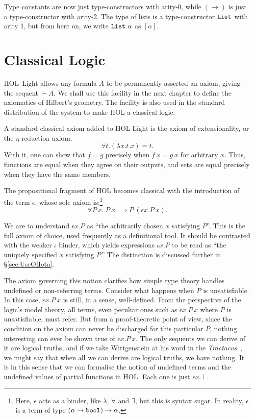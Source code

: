 Type constants are now just type-constructors with arity-0, while $(\rightarrow)$ is just a type-constructor with arity-2. The type of lists is a type-constructor $\texttt{List}$ with arity 1, but from here on, we write $\texttt{List}\ \alpha$ as $[\alpha]$.

\section{Classical Logic}\label{sec:ClassicalAxioms}
HOL~Light allows any formula $A$ to be permanently asserted an axiom, giving the sequent $\vdash A$. We shall use this facility in the next chapter to define the axiomatics of Hilbert's geometry. The facility is also used in the standard distribution of the system to make HOL a classical logic.

A standard classical axiom added to HOL Light is the axiom of extensionality, or the $\eta$-reduction axiom. 
\begin{displaymath}
\forall t. (\lambda x. t\ x) = t.
\end{displaymath}
With it, one can show that $f = g$ precisely when $f\ x = g\ x$ for arbitrary $x$. Thus, functions are equal when they agree on their outputs, and sets are equal precisely when they have the same members.

The propositional fragment of HOL becomes classical with the introduction of the term $\epsilon$, whose sole axiom is:\footnote{Here, $\epsilon$ acts as a binder, like $\lambda$, $\forall$ and $\exists$, but this is syntax sugar. In reality, $\epsilon$ is a term of type $(\alpha \rightarrow \texttt{bool}) \rightarrow \alpha$.}
\begin{displaymath}
\forall P\ x.\ P\ x \implies P\ (\epsilon x. P\ x).
\end{displaymath}

We are to understand $\epsilon x. P$ as ``the arbitrarily chosen $x$ satisfying $P$''. This is the full axiom of choice, used frequently as a definitional tool. It should be contrasted with the weaker $\iota$ binder, which yields expressions $\iota x. P$ to be read as ``the uniquely specified $x$ satisfying $P$.'' The distinction is discussed further in \S\ref{sec:UseOfIota}.

The axiom governing this notion clarifies how simple type theory handles undefined or non-referring terms. Consider what happens when $P$ is unsatisfiable. In this case, $\epsilon x. P\ x$ is still, in a sense, well-defined. From the perspective of the logic's model theory, all terms, even peculiar ones such as $\epsilon x. P\ x$ where $P$ is unsatisfiable, must refer. But from a proof-theoretic point of view, since the condition on the axiom can never be discharged for this particular $P$, nothing interesting can ever be shown true of $\epsilon x. P\ x$. The only sequents we can derive of it are logical truths, and if we take Wittgenstein at his word in the \emph{Tractacus}~\cite{ToWitNothing}, we might say that when all we can derive are logical truths, we have nothing. It is in this sense that we can formalise the notion of undefined terms and the undefined values of partial functions in HOL. Each one is just $\epsilon x. \bot$.

